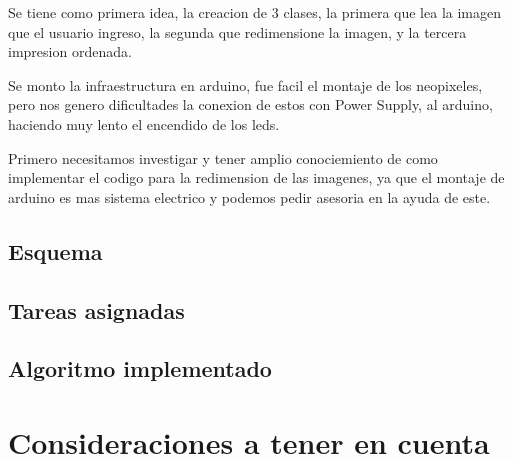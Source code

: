\documentclass{article}
\begin{document}
\vspace{1cm}

Se tiene como primera idea, la creacion de 3 clases, la primera que lea la imagen que el usuario ingreso, la segunda que redimensione la imagen, y la tercera impresion ordenada.

\vspace{1cm}

Se monto la infraestructura en arduino, fue facil el montaje de los neopixeles, pero nos genero dificultades la conexion de estos con Power Supply, al arduino, haciendo muy lento el encendido de los leds.

\vspace{1cm}

Primero necesitamos investigar y tener amplio conociemiento de como implementar el codigo para la redimension de las imagenes, ya que el montaje de arduino es mas sistema electrico y podemos pedir asesoria en la ayuda de este.

\vspace{8cm}

\subsection{Esquema}

 \vspace{1cm}
 


 \vspace{1cm}
 


 \vspace{1cm}
 


 \vspace{1cm}


\subsection{Tareas asignadas}



\vspace{5cm}

\subsection{Algoritmo implementado}



\vspace{1cm}



\vspace{8cm}
\section{Consideraciones a tener en cuenta} 




\vspace{1cm}



\end{document}
